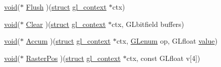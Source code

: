 \begin{DoxyCompactItemize}
\hyperlink{interfacevoid}{void}($\ast$ \hyperlink{structdd__function__table_a0680f8de4e049f72cfb10cf5867a85f5}{Flush} )(\hyperlink{interfacestruct}{struct} \hyperlink{structgl__context}{gl\+\_\+context} $\ast$ctx)
\item 
\hyperlink{interfacevoid}{void}($\ast$ \hyperlink{structdd__function__table_a5ff278dbc44c864bab3d198b40f0cff9}{Clear} )(\hyperlink{interfacestruct}{struct} \hyperlink{structgl__context}{gl\+\_\+context} $\ast$ctx, G\+Lbitfield buffers)
\item 
\hyperlink{interfacevoid}{void}($\ast$ \hyperlink{structdd__function__table_aec6b2d3bc372cc7796bf30ae6eb297e4}{Accum} )(\hyperlink{interfacestruct}{struct} \hyperlink{structgl__context}{gl\+\_\+context} $\ast$ctx, \hyperlink{interfacevoid}{G\+Lenum} op, G\+Lfloat \hyperlink{unionvalue}{value})
\item 
\hyperlink{interfacevoid}{void}($\ast$ \hyperlink{structdd__function__table_ac39afdd3daf3f75b50295df734241d86}{Raster\+Pos} )(\hyperlink{interfacestruct}{struct} \hyperlink{structgl__context}{gl\+\_\+context} $\ast$ctx, const G\+Lfloat v\mbox{[}4\mbox{]})
\end{DoxyCompactItemize}
